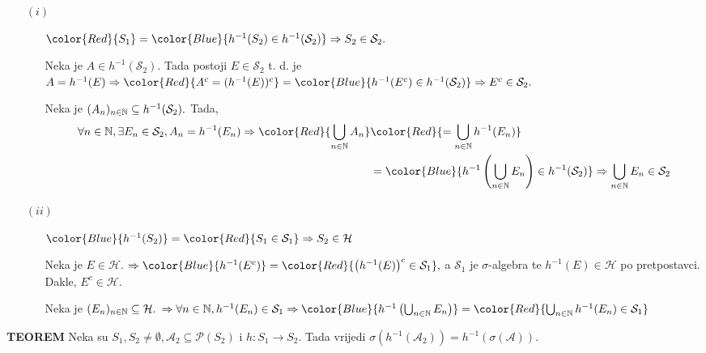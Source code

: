 \documentclass{article}
\begin{document}
\begin{enumerate}
    \item[\((i)\)] \begin{itemize}
        \item[\ding{113}] \({\color{Red}{S_1}}={\color{Blue}{h^{-1}(S_2)\in h^{-1}(\mathcal S_2)}}\Rightarrow S_2\in\mathcal S_2.\) 
        \item[\ding{113}] Neka je \(A\in h^{-1}(\mathcal S_2).\) Tada postoji \(E\in\mathcal S_2\) t. d. je\newline \(A=h^{-1}(E)\Rightarrow {\color{Red}{A^c=(h^{-1}(E))^c}}={\color{Blue}{h^{-1}(E^c)\in h^{-1}(\mathcal S_2)}}\Rightarrow E^c\in\mathcal S_2.\)
        \item[\ding{113}] Neka je \((A_n)_{n\in\Bbb N}\subseteq h^{-1}(\mathcal S_2).\) Tada, \[\begin{aligned}\forall n\in\Bbb N,\exists E_n\in\mathcal S_2, A_n=h^{-1}(E_n)\Rightarrow{\color{Red}{\bigcup_{n\in\Bbb N}A_n}}&{\color{Red}{=\bigcup_{n\in\Bbb N}h^{-1}(E_n)}}\\&={\color{Blue}{h^{-1}\left(\bigcup_{n\in\Bbb N}E_n\right)\in h^{-1}(\mathcal S_2)}}\Rightarrow\bigcup_{n\in\Bbb N}E_n\in\mathcal S_2\end{aligned}\]
    \end{itemize}
    \item[\((ii)\)] \begin{itemize}
        \item[\ding{113}] \({\color{Blue}{h^{-1}(S_2)}}={\color{Red}{S_1\in\mathcal S_1}}\Rightarrow S_2\in\mathcal H\)
        \item[\ding{113}] Neka je \(E\in\mathcal H.\) \(\Rightarrow {\color{Blue}{h^{-1}(E^c)}}={\color{Red}{\left(h^{-1}(E)\right)^c\in\mathcal S_1}},\) a \(\mathcal S_1\) je \(\sigma\)-algebra te \(h^{-1}(E)\in\mathcal H\) po pretpostavci. Dakle, \(E^c\in\mathcal H.\) 
        \item[\ding{113}] Neka je \((E_n)_{n\in\Bbb N}\subseteq\mathcal H.\) \(\Rightarrow\forall n\in\Bbb N, h^{-1}(E_n)\in\mathcal S_1\Rightarrow {\color{Blue}{h^{-1}\left(\bigcup_{n\in\Bbb N}E_n\right)}}={\color{Red}{\bigcup_{n\in\Bbb N}h^{-1}(E_n)\in\mathcal S_1}}\)
    \end{itemize}
\end{enumerate}
\textbf{TEOREM}\newline
Neka su \(S_1,S_2\ne\emptyset,\mathcal A_2\subseteq\mathcal P(S_2)\) i \(h:S_1\to S_2.\) Tada vrijedi \(\sigma\left(h^{-1}(\mathcal A_2)\right)=h^{-1}\left(\sigma(\mathcal A)\right).\)\newline\newline
\end{document}
